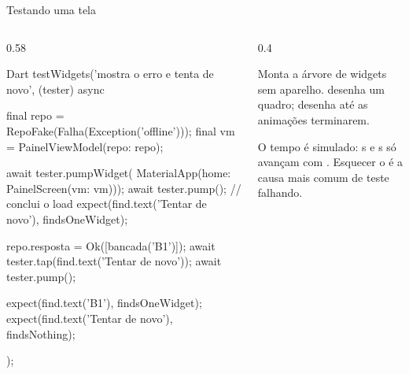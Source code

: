 \documentclass[aspectratio=169,10pt]{beamer}
\begin{document}
\begin{frame}[fragile]{Testando uma tela}
  \begin{columns}[T]
    \begin{column}{0.58\textwidth}
\begin{codigo}[title=test/ui/painel\_screen\_test.dart]{Dart}
testWidgets('mostra o erro e tenta de novo', (tester) async {
  final repo = RepoFake(Falha(Exception('offline')));
  final vm = PainelViewModel(repo: repo);

  await tester.pumpWidget(
      MaterialApp(home: PainelScreen(vm: vm)));
  await tester.pump();                  // conclui o load
  expect(find.text('Tentar de novo'), findsOneWidget);

  repo.resposta = Ok([bancada('B1')]);
  await tester.tap(find.text('Tentar de novo'));
  await tester.pump();

  expect(find.text('B1'), findsOneWidget);
  expect(find.text('Tentar de novo'), findsNothing);
});
\end{codigo}
    \end{column}
    \begin{column}{0.4\textwidth}
      \begin{conceito}
        Monta a árvore de widgets sem aparelho.  desenha um quadro;  desenha até as animações terminarem.
      \end{conceito}
      \begin{atencao}
        O tempo é simulado: s e s só avançam com . Esquecer o  é a causa mais comum de teste falhando.
      \end{atencao}
    \end{column}
  \end{columns}
\end{frame}
\end{document}
